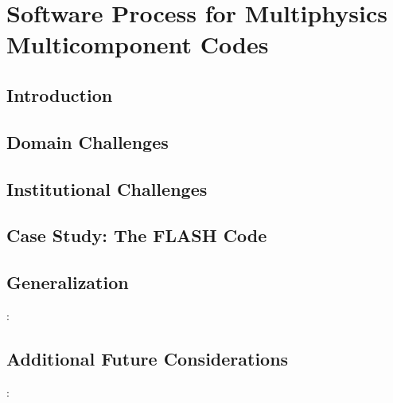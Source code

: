 \documentclass[sunil1]{sunil} %
\begin{document}

\chapter{Software Process for Multiphysics Multicomponent Codes}
\section {Introduction} 

\section{Domain Challenges} 

\section{Institutional Challenges}

\section{Case Study: The FLASH Code}

\section{Generalization} : 

\section{Additional Future Considerations}: 



\end{document}
